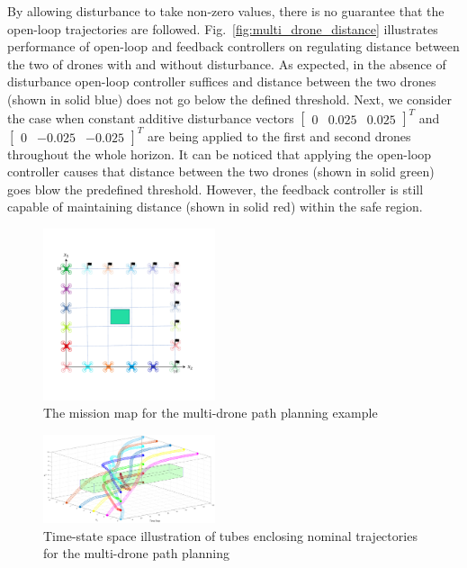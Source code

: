 By allowing disturbance to take non-zero values, there is no guarantee that the open-loop trajectories are followed. Fig.~\ref{fig:multi_drone_distance} illustrates performance of open-loop and feedback controllers on regulating distance between the two of drones with and without disturbance. As expected, in the absence of disturbance open-loop controller suffices and distance between the two drones (shown in solid blue) does not go below the defined threshold. Next, we consider the case when constant additive disturbance vectors $\begin{bmatrix}0 &0.025&0.025\end{bmatrix}^T$ and $\begin{bmatrix}0 &-0.025&-0.025\end{bmatrix}^T$ are being applied to the first and second drones throughout the whole horizon. It can be noticed that applying the open-loop controller causes that distance between the two drones (shown in solid green) goes blow the predefined threshold. However, the feedback controller is still capable of maintaining distance (shown in solid red) within the safe region.
\begin{figure}[t]
	\centering
	\includegraphics[width=0.45\textwidth]{figures/MA1.pdf}
	\caption{The mission map for the multi-drone path planning example}
	\label{fig:MA}
\end{figure}

\begin{figure}[t]
	\centering
	\includegraphics[width=0.45\textwidth]{figures/tubes10.eps}
	\caption{Time-state space illustration of tubes enclosing nominal trajectories for the multi-drone path planning}
	\label{fig:3dtubes}
\end{figure}

